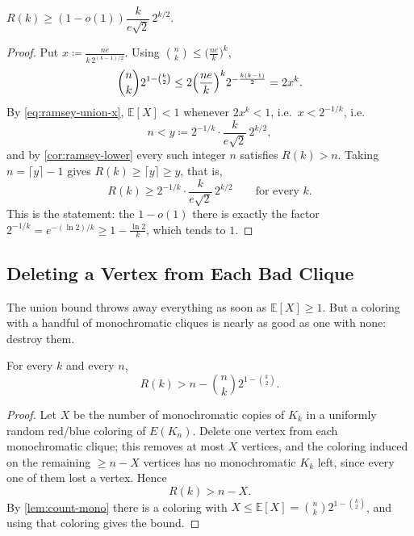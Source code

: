 \begin{proposition}\label{prop:ramsey-union-sharp}
    \(R(k) \ge (1 - o(1)) \dfrac{k}{e \sqrt{2}} \, 2^{k/2}\).
\end{proposition}

\begin{proof}
    Put \(x \coloneqq \frac{ne}{k \, 2^{(k-1)/2}}\). Using \(\binom{n}{k} \le \bigl( \frac{ne}{k} \bigr)^k\),
    \begin{equation}\label{eq:ramsey-union-x}
        \binom{n}{k} 2^{1 - \binom{k}{2}}
        \le 2 \Bigl( \frac{ne}{k} \Bigr)^{k} 2^{-\frac{k(k-1)}{2}}
        = 2 x^{k}.
    \end{equation}
    By \eqref{eq:ramsey-union-x}, \(\mathbb{E}[X] < 1\) whenever \(2x^k < 1\), i.e.\ \(x < 2^{-1/k}\), i.e.
    \[
        n < y \coloneqq 2^{-1/k} \cdot \frac{k}{e \sqrt{2}} \, 2^{k/2},
    \]
    and by \autoref{cor:ramsey-lower} every such integer \(n\) satisfies \(R(k) > n\). Taking \(n = \lceil y \rceil - 1\) gives \(R(k) \ge \lceil y \rceil \ge y\), that is,
    \[
        R(k) \ge 2^{-1/k} \cdot \frac{k}{e \sqrt{2}} \, 2^{k/2}
        \qquad\text{for every } k.
    \]
    This is the statement: the \(1 - o(1)\) there is exactly the factor \(2^{-1/k} = e^{-(\ln 2)/k} \ge 1 - \frac{\ln 2}{k}\), which tends to \(1\).
\end{proof}

\subsection{Deleting a Vertex from Each Bad Clique}

The union bound throws away everything as soon as \(\mathbb{E}[X] \ge 1\). But a coloring with a handful of monochromatic cliques is nearly as good as one with none: destroy them.

\begin{theorem}\label{thm:ramsey-alteration}
    For every \(k\) and every \(n\),
    \[
        R(k) > n - \binom{n}{k} 2^{1 - \binom{k}{2}}.
    \]
\end{theorem}

\begin{proof}
    Let \(X\) be the number of monochromatic copies of \(K_k\) in a uniformly random red/blue coloring of \(E(K_n)\). Delete one vertex from each monochromatic clique; this removes at most \(X\) vertices, and the coloring induced on the remaining \(\ge n - X\) vertices has no monochromatic \(K_k\) left, since every one of them lost a vertex. Hence
    \[
        R(k) > n - X.
    \]
    By \autoref{lem:count-mono} there is a coloring with \(X \le \mathbb{E}[X] = \binom{n}{k} 2^{1-\binom{k}{2}}\), and using that coloring gives the bound.
\end{proof}

